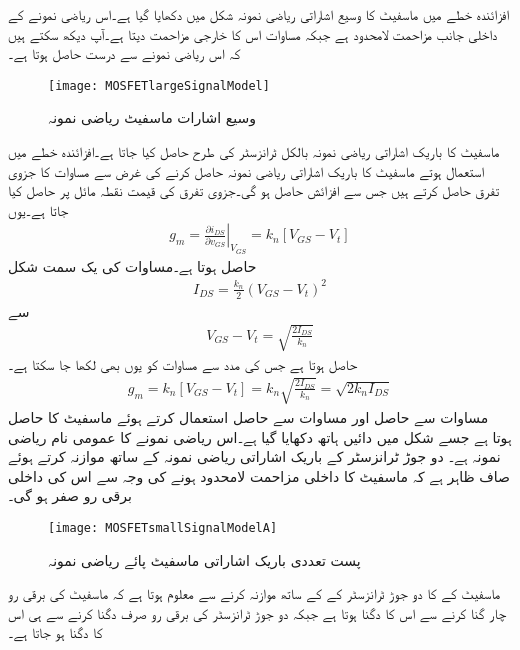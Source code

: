 افزائندہ خطے میں ماسفیٹ کا وسیع اشاراتی ریاضی نمونہ شکل   میں دکھایا گیا ہے۔اس ریاضی نمونے کے داخلی جانب مزاحمت لامحدود ہے جبکہ مساوات   اس کا خارجی مزاحمت   دیتا ہے۔آپ دیکھ سکتے ہیں کہ اس ریاضی نمونے  سے درست   حاصل ہوتا ہے۔
\begin{figure}
\centering
\texttt{[image: MOSFETlargeSignalModel]}
\caption{وسیع اشارات ماسفیٹ ریاضی نمونہ}
\label{شکل_وسیع_اشارات_ماسفیٹ_ماڈل}
\end{figure}

ماسفیٹ کا باریک اشاراتی ریاضی نمونہ بالکل  ٹرانزسٹر کی طرح حاصل کیا جاتا ہے۔افزائندہ خطے میں استعمال ہوتے ماسفیٹ کا باریک اشاراتی ریاضی نمونہ حاصل کرنے کی غرض سے مساوات   کا جزوی تفرق حاصل کرتے ہیں جس سے افزائش  حاصل ہو گی۔جزوی تفرق کی قیمت نقطہ مائل  پر حاصل کیا جاتا ہے۔یوں
\begin{align} \label{مساوات_میدانی_موصلیت_نما}
g_m = \left. \frac{\partial i_{DS}}{\partial v_{GS}} \right |_{V_{GS}}=k_n \left[V_{GS}-V_t \right ]
\end{align}
حاصل ہوتا ہے۔مساوات   کی یک سمت شکل
\begin{align*}
I_{DS}=\frac{k_n}{2}\left(V_{GS}-V_t \right)^2
\end{align*}
سے
\begin{align*}
V_{GS}-V_t=\sqrt{\frac{2 I_{DS}}{k_n}}
\end{align*}
حاصل ہوتا ہے جس کی مدد سے مساوات  کو  یوں بھی لکھا جا سکتا ہے۔
\begin{align} \label{مساوات_میدانی_موصلیت_نما_الف}
g_m=k_n \left[V_{GS}-V_t \right ]=k_n \sqrt{\frac{2 I_{DS}}{k_n}}=\sqrt{2 k_n I_{DS}}
\end{align}
مساوات   سے حاصل   اور مساوات   سے حاصل   استعمال کرتے ہوئے ماسفیٹ کا  حاصل ہوتا ہے جسے شکل   میں دائیں ہاتھ دکھایا گیا ہے۔اس ریاضی نمونے کا عمومی نام   ریاضی نمونہ ہے۔ دو جوڑ ٹرانزسٹر کے باریک اشاراتی ریاضی نمونہ کے ساتھ موازنہ کرتے ہوئے صاف ظاہر ہے کہ ماسفیٹ کا داخلی مزاحمت لامحدود ہونے کی وجہ سے اس کی داخلی برقی رو صفر ہو گی۔
\begin{figure}
\centering
\texttt{[image: MOSFETsmallSignalModelA]}
\caption{پست تعددی باریک اشاراتی ماسفیٹ پائے ریاضی نمونہ}
\label{شکل_باریک_اشاراتی_ماسفیٹ_ماڈل}
\end{figure}
ماسفیٹ کے  کا دو جوڑ ٹرانزسٹر کے    کے ساتھ موازنہ کرنے سے معلوم ہوتا ہے کہ ماسفیٹ کی برقی رو چار گنا کرنے سے اس کا    دگنا ہوتا ہے جبکہ دو جوڑ ٹرانزسٹر کی برقی رو صرف دگنا کرنے سے ہی اس کا  دگنا ہو جاتا ہے۔

